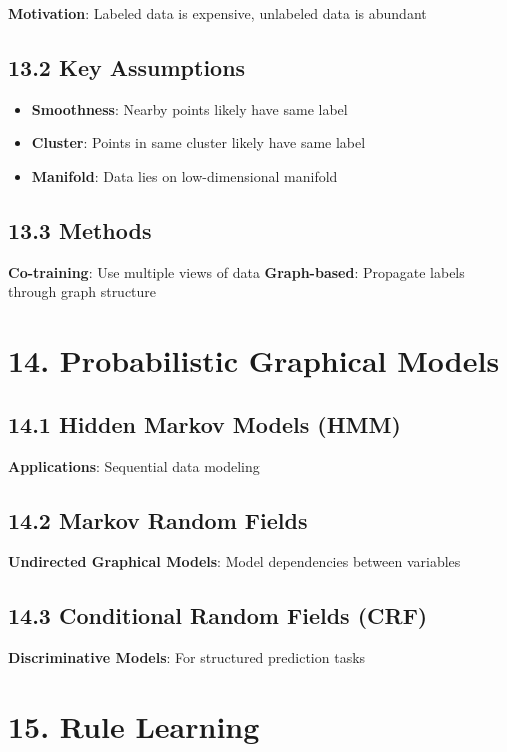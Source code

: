 \documentclass{amsart}
\theoremstyle{plain}
\theoremstyle{definition}
\theoremstyle{remark}
\begin{document}
\textbf{Motivation}: Labeled data is expensive, unlabeled data is abundant

\subsection{13.2 Key Assumptions}

\begin{itemize}
	\item \textbf{Smoothness}: Nearby points likely have same label
	\item \textbf{Cluster}: Points in same cluster likely have same label
	\item \textbf{Manifold}: Data lies on low-dimensional manifold
\end{itemize}

\subsection{13.3 Methods}

\textbf{Co-training}: Use multiple views of data
\textbf{Graph-based}: Propagate labels through graph structure

\section{14. Probabilistic Graphical Models}

\subsection{14.1 Hidden Markov Models (HMM)}

\textbf{Applications}: Sequential data modeling

\subsection{14.2 Markov Random Fields}

\textbf{Undirected Graphical Models}: Model dependencies between variables

\subsection{14.3 Conditional Random Fields (CRF)}

\textbf{Discriminative Models}: For structured prediction tasks

\section{15. Rule Learning}
\end{document}
